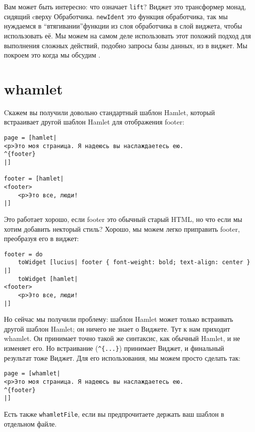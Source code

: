 \begin{remark}
Вам может быть интересно: что означает \lstinline'lift'? Виджет это трансформер монад, сидящий cверху Обработчика. \lstinline'newIdent' это функция обработчика, так мы нуждаемся в \textquotedblleft втягивании\textquotedblright функции из слоя обработчика в слой виджета, чтобы использовать её. Мы можем на самом деле использовать этот похожий подход для выполнения сложных действий, подобно запросы базы данных, из в виджет. Мы покроем это когда мы обсудим .
\end{remark}

\section{whamlet}

Cкажем вы получили довольно стандартный шаблон Hamlet, который встрааивает другой шаблон Hamlet для отображения footer:

\begin{lstlisting}
page = [hamlet|
<p>Это моя страница. Я надеюсь вы наслаждаетесь ею.
^{footer}
|]

footer = [hamlet|
<footer>
    <p>Это все, люди!
|]
\end{lstlisting}

Это работает хорошо, если footer это обычный старый HTML, но что если мы хотим добавить некторый стиль? Хорошо, мы можем легко приправить footer, преобразуя его в виджет:

\begin{lstlisting}
footer = do
    toWidget [lucius| footer { font-weight: bold; text-align: center } |]
    toWidget [hamlet|
<footer>
    <p>Это все, люди!
|]
\end{lstlisting}

Но сейчас мы получили проблему: шаблон Hamlet может только встраивать другой шаблон Hamlet; он ничего не знает о Виджете. Тут к нам приходит whamlet. Он принимает точно такой же синтаксис, как обычный Hamlet, и не изменяет его. Но встраивание (\lstinline!^{...}!) принимает Виджет, и финальный результат тоже Виджет. Для его использования, мы можем просто сделать так:

\begin{lstlisting}
page = [whamlet|
<p>Это моя страница. Я надеюсь вы наслаждаетесь ею.
^{footer}
|]
\end{lstlisting}


Есть также \lstinline'whamletFile', если вы предпрочитаете держать ваш шаблон в отдельном файле.

